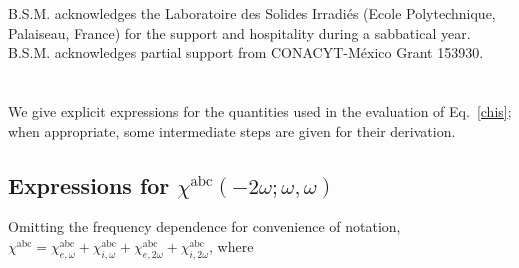 \documentclass[floatfix,prb,aps,superscriptaddress,showpacs,11pt,preprint,letterpaper]{revtex4}
\begin{document}
B.S.M. acknowledges the Laboratoire des Solides Irradi\'es (Ecole
Polytechnique, Palaiseau, France) for the support and hospitality
during a sabbatical year. B.S.M. acknowledges partial support from
CONACYT-M\'exico Grant 153930. 

\appendix 
\section{}\label{appe}
We give explicit expressions for the quantities used in the evaluation 
of Eq.~\eqref{chis}; when appropriate, some 
intermediate steps are given for their derivation. 
\subsection{ Expressions for 
\texorpdfstring{$\chi^{\mathrm{a}\mathrm{b}\mathrm{c}}(-2\omega;\omega,\omega)$}{que} 
}\label{fullchis}
Omitting the frequency dependence for convenience of notation,
$\chi^{\mathrm{a}\mathrm{b}\mathrm{c}}
=
\chi^{\mathrm{a}\mathrm{b}\mathrm{c}}_{e,\omega}
+
\chi^{\mathrm{a}\mathrm{b}\mathrm{c}}_{i,\omega}
+
\chi^{\mathrm{a}\mathrm{b}\mathrm{c}}_{e,2\omega}
+
\chi^{\mathrm{a}\mathrm{b}\mathrm{c}}_{i,2\omega}
$, where 
\end{document}
